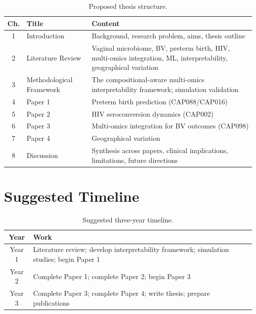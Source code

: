 \documentclass[12pt,a4paper]{report}
\begin{document}
\begin{table}[h]
\centering
\begin{tabular}{clp{8cm}}
\toprule
\textbf{Ch.} & \textbf{Title} & \textbf{Content} \\
\midrule
1 & Introduction & Background, research problem, aims, thesis outline \\
2 & Literature Review & Vaginal microbiome, BV, preterm birth, HIV, multi-omics integration, ML, interpretability, geographical variation \\
3 & Methodological Framework & The compositional-aware multi-omics interpretability framework; simulation validation \\
4 & Paper 1 & Preterm birth prediction (CAP088/CAP016) \\
5 & Paper 2 & HIV seroconversion dynamics (CAP002) \\
6 & Paper 3 & Multi-omics integration for BV outcomes (CAP098) \\
7 & Paper 4 & Geographical variation \\
8 & Discussion & Synthesis across papers, clinical implications, limitations, future directions \\
\bottomrule
\end{tabular}
\caption{Proposed thesis structure.}
\label{tab:thesis}
\end{table}

\section{Suggested Timeline}

\begin{table}[h]
\centering
\begin{tabular}{cp{10cm}}
\toprule
\textbf{Year} & \textbf{Work} \\
\midrule
Year 1 & Literature review; develop interpretability framework; simulation studies; begin Paper 1 \\
Year 2 & Complete Paper 1; complete Paper 2; begin Paper 3 \\
Year 3 & Complete Paper 3; complete Paper 4; write thesis; prepare publications \\
\bottomrule
\end{tabular}
\caption{Suggested three-year timeline.}
\label{tab:timeline}
\end{table}

\end{document}
